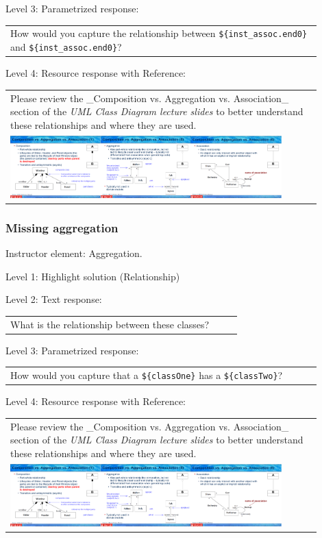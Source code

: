 \noindent Level 3: Parametrized response: \medskip

\begin{tabular}{|p{0.9\linewidth}}
How would you capture the relationship between \verb|${inst_assoc.end0}| and \verb|${inst_assoc.end0}|?
\end{tabular} \medskip

\noindent Level 4: Resource response with Reference: \medskip

\begin{tabular}{|p{0.9\linewidth}}
Please review the _Composition vs. Aggregation vs. Association_ section of 
the \textit{UML Class Diagram lecture slides} to 
better understand these relationships and where they are used.

\\
\includegraphics[width=0.9\textwidth]{images/composition_aggregation_association.png}
\end{tabular} \medskip


\subsubsection{Missing aggregation}

Instructor element: Aggregation. \medskip

\noindent Level 1: Highlight solution (Relationship) \medskip

\noindent Level 2: Text response: \medskip

\begin{tabular}{|p{0.9\linewidth}}
What is the relationship between these classes?
\end{tabular} \medskip

\noindent Level 3: Parametrized response: \medskip

\begin{tabular}{|p{0.9\linewidth}}
How would you capture that a \verb|${classOne}| has a \verb|${classTwo}|?
\end{tabular} \medskip

\noindent Level 4: Resource response with Reference: \medskip

\begin{tabular}{|p{0.9\linewidth}}
Please review the _Composition vs. Aggregation vs. Association_ section of 
the \textit{UML Class Diagram lecture slides} to 
better understand these relationships and where they are used.

\\
\includegraphics[width=0.9\textwidth]{images/composition_aggregation_association.png}
\end{tabular} \medskip


